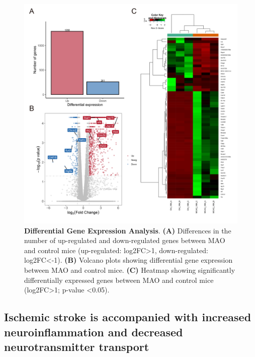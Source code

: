 \documentclass[
  a4paper,
]{article}
\begin{document}
\begin{figure}[H]

{\centering \includegraphics{./figure/Figure-3.png}

}

\caption{\label{fig-differential}\textbf{Differential Gene Expression
Analysis}. \textbf{(A) } Differences in the number of up-regulated and
down-regulated genes between MAO and control mice (up-regulated:
log2FC\textgreater1, down-regulated: log2FC\textless-1). \textbf{(B) }
Volcano plots showing differential gene expression between MAO and
control mice. \textbf{(C) } Heatmap showing significantly differentially
expressed genes between MAO and control mice
(\textbar log2FC\textbar\textgreater1; p-value \textless0.05).}

\end{figure}

\hypertarget{ischemic-stroke-is-accompanied-with-increased-neuroinflammation-and-decreased-neurotransmitter-transport}{%
\subsection{Ischemic stroke is accompanied with increased
neuroinflammation and decreased neurotransmitter
transport}\label{ischemic-stroke-is-accompanied-with-increased-neuroinflammation-and-decreased-neurotransmitter-transport}}
\end{document}
